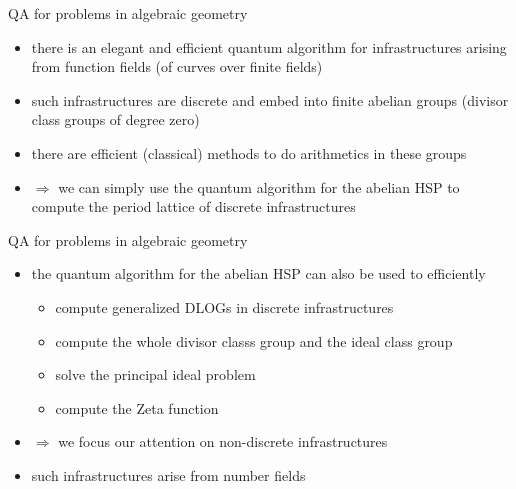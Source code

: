 \documentclass[slideColor]{prosper}
\renewcommand{\>}{\rangle}
\newcommand{\<}{\langle}
\begin{document}

\begin{slide}{QA for problems in algebraic geometry}
\begin{itemize}
\item there is an elegant and efficient quantum algorithm for infrastructures arising from function fields (of curves over finite fields)

\medskip
\item such infrastructures are discrete and embed into finite abelian groups (divisor class groups of degree zero)

\medskip
\item there are efficient (classical) methods to do arithmetics in these groups

\medskip
\item $\Rightarrow$ we can simply use the quantum algorithm for the abelian HSP to compute the period lattice of discrete infrastructures

\end{itemize}

\end{slide}


\begin{slide}{QA for problems in algebraic geometry}
\vspace{-0.2cm}
\begin{itemize}
\item the quantum algorithm for the abelian HSP can also be used to efficiently

\medskip
\begin{itemize}
\item compute generalized DLOGs in discrete infrastructures

\medskip
\item compute the whole divisor classs group and the ideal class group

\medskip
\item solve the principal ideal problem

\medskip
\item compute the Zeta function

\end{itemize}

\medskip
\item $\Rightarrow$ we focus our attention on non-discrete infrastructures

\medskip
\item such infrastructures arise from number fields

\end{itemize}

\end{slide}
\end{document}
